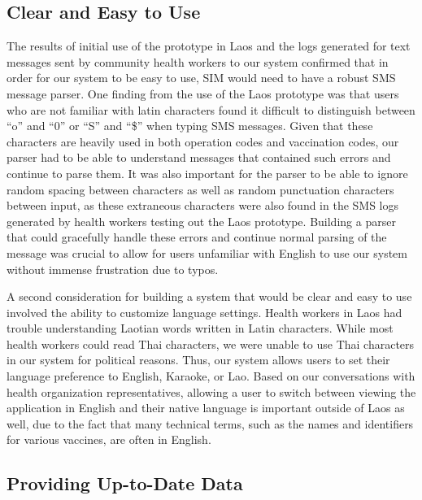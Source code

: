 \documentclass{acm_proc_article-sp}
\begin{document}
\subsection{Clear and Easy to Use}

The results of initial use of the prototype in Laos and the logs generated for text messages sent by community health workers to our system confirmed that in order for our system to be easy to use, SIM would need to have a robust SMS message parser. One finding from the use of the Laos prototype was that users who are not familiar with latin characters found it difficult to distinguish between ``o'' and ``0'' or ``S'' and ``\$'' when typing SMS messages. Given that these characters are heavily used in both operation codes and vaccination codes, our parser had to be able to understand messages that contained such errors and continue to parse them. It was also important for the parser to be able to ignore random spacing between characters as well as random punctuation characters between input, as these extraneous characters were also found in the SMS logs generated by health workers testing out the Laos prototype. Building a parser that could gracefully handle these errors and continue normal parsing of the message was crucial to allow for users unfamiliar with English to use our system without immense frustration due to typos.

A second consideration for building a system that would be clear and easy to use involved the ability to customize language settings. Health workers in Laos had trouble understanding Laotian words written in Latin characters. While most health workers could read Thai characters, we were unable to use Thai characters in our system for political reasons. Thus, our system allows users to set their language preference to English, Karaoke, or Lao. Based on our conversations with health organization representatives, allowing a user to switch between viewing the application in English and their native language is important outside of Laos as well, due to the fact that many technical terms, such as the names and identifiers for various vaccines, are often in English.

\subsection{Providing Up-to-Date Data}
\end{document}
